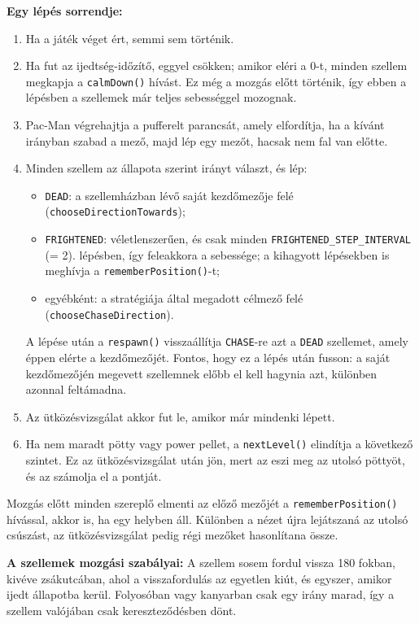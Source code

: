 \documentclass[11pt, a4paper]{article}
\begin{document}
\textbf{Egy lépés sorrendje:}
\begin{enumerate}
    \item Ha a játék véget ért, semmi sem történik.
    \item Ha fut az ijedtség-időzítő, eggyel csökken; amikor eléri a 0-t, minden szellem megkapja a \texttt{calmDown()} hívást. Ez még a mozgás előtt történik, így ebben a lépésben a szellemek már teljes sebességgel mozognak.
    \item Pac-Man végrehajtja a pufferelt parancsát, amely elfordítja, ha a kívánt irányban szabad a mező, majd lép egy mezőt, hacsak nem fal van előtte.
    \item Minden szellem az állapota szerint irányt választ, és lép:
    \begin{itemize}
        \item \texttt{DEAD}: a szellemházban lévő saját kezdőmezője felé (\texttt{chooseDirectionTowards});
        \item \texttt{FRIGHTENED}: véletlenszerűen, és csak minden \texttt{FRIGHTENED\_STEP\_INTERVAL} (= 2). lépésben, így feleakkora a sebessége; a kihagyott lépésekben is meghívja a \texttt{rememberPosition()}-t;
        \item egyébként: a stratégiája által megadott célmező felé (\texttt{chooseChaseDirection}).
    \end{itemize}
    A lépése után a \texttt{respawn()} visszaállítja \texttt{CHASE}-re azt a \texttt{DEAD} szellemet, amely éppen elérte a kezdőmezőjét. Fontos, hogy ez a lépés után fusson: a saját kezdőmezőjén megevett szellemnek előbb el kell hagynia azt, különben azonnal feltámadna.
    \item Az ütközésvizsgálat akkor fut le, amikor már mindenki lépett.
    \item Ha nem maradt pötty vagy power pellet, a \texttt{nextLevel()} elindítja a következő szintet. Ez az ütközésvizsgálat után jön, mert az eszi meg az utolsó pöttyöt, és az számolja el a pontját.
\end{enumerate}
Mozgás előtt minden szereplő elmenti az előző mezőjét a \texttt{rememberPosition()} hívással, akkor is, ha egy helyben áll. Különben a nézet újra lejátszaná az utolsó csúszást, az ütközésvizsgálat pedig régi mezőket hasonlítana össze.

\textbf{A szellemek mozgási szabályai:} A szellem sosem fordul vissza 180 fokban, kivéve zsákutcában, ahol a visszafordulás az egyetlen kiút, és egyszer, amikor ijedt állapotba kerül. Folyosóban vagy kanyarban csak egy irány marad, így a szellem valójában csak kereszteződésben dönt.
\end{document}
